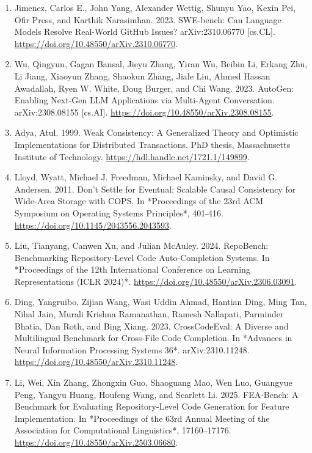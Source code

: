 \documentclass[9pt,letterpaper]{extarticle}
\begin{document}
\begin{enumerate}
\item \label{ref:19} Jimenez, Carlos E., John Yang, Alexander Wettig, Shunyu Yao, Kexin Pei, Ofir Press, and Karthik Narasimhan. 2023. {}SWE-bench: Can Language Models Resolve Real-World GitHub Issues?{} arXiv:2310.06770 [cs.CL]. \url{https://doi.org/10.48550/arXiv.2310.06770}.
\item \label{ref:20} Wu, Qingyun, Gagan Bansal, Jieyu Zhang, Yiran Wu, Beibin Li, Erkang Zhu, Li Jiang, Xiaoyun Zhang, Shaokun Zhang, Jiale Liu, Ahmed Hassan Awadallah, Ryen W. White, Doug Burger, and Chi Wang. 2023. {}AutoGen: Enabling Next-Gen LLM Applications via Multi-Agent Conversation.{} arXiv:2308.08155 [cs.AI]. \url{https://doi.org/10.48550/arXiv.2308.08155}.
\item \label{ref:21} Adya, Atul. 1999. {}Weak Consistency: A Generalized Theory and Optimistic Implementations for Distributed Transactions.{} PhD thesis, Massachusetts Institute of Technology. \url{https://hdl.handle.net/1721.1/149899}.
\item \label{ref:22} Lloyd, Wyatt, Michael J. Freedman, Michael Kaminsky, and David G. Andersen. 2011. {}Don't Settle for Eventual: Scalable Causal Consistency for Wide-Area Storage with COPS.{} In *Proceedings of the 23rd ACM Symposium on Operating Systems Principles*, 401-416. \url{https://doi.org/10.1145/2043556.2043593}.
\item \label{ref:23} Liu, Tianyang, Canwen Xu, and Julian McAuley. 2024. {}RepoBench: Benchmarking Repository-Level Code Auto-Completion Systems.{} In *Proceedings of the 12th International Conference on Learning Representations (ICLR 2024)*. \url{https://doi.org/10.48550/arXiv.2306.03091}.
\item \label{ref:24} Ding, Yangruibo, Zijian Wang, Wasi Uddin Ahmad, Hantian Ding, Ming Tan, Nihal Jain, Murali Krishna Ramanathan, Ramesh Nallapati, Parminder Bhatia, Dan Roth, and Bing Xiang. 2023. {}CrossCodeEval: A Diverse and Multilingual Benchmark for Cross-File Code Completion.{} In *Advances in Neural Information Processing Systems 36*. arXiv:2310.11248. \url{https://doi.org/10.48550/arXiv.2310.11248}.
\item \label{ref:25} Li, Wei, Xin Zhang, Zhongxin Guo, Shaoguang Mao, Wen Luo, Guangyue Peng, Yangyu Huang, Houfeng Wang, and Scarlett Li. 2025. {}FEA-Bench: A Benchmark for Evaluating Repository-Level Code Generation for Feature Implementation.{} In *Proceedings of the 63rd Annual Meeting of the Association for Computational Linguistics*, 17160--17176. \url{https://doi.org/10.48550/arXiv.2503.06680}.

\end{enumerate}
\end{document}
